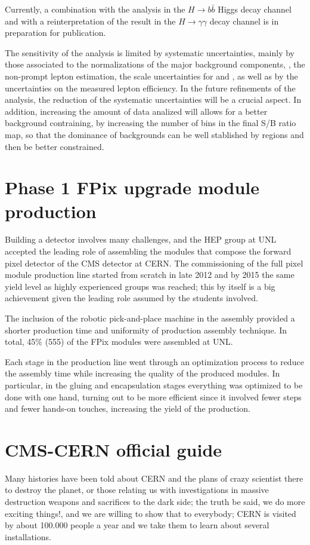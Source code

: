 Currently, a combination with the \tH analysis in the $H \to b\bar{b}$ Higgs decay channel and with a reinterpretation of the \ttH result in the $H\to \gamma\gamma$ decay channel is in preparation for publication.

The sensitivity of the analysis is limited by systematic uncertainties, mainly by those associated to the normalizations of the major background components, \ie, the non-prompt lepton estimation, the scale uncertainties for \ttW and \ttZ, as well as by the uncertainties on the measured lepton efficiency. In the future refinements of the analysis,  the reduction of the systematic uncertainties will be a crucial aspect. In addition, increasing the amount of data analized will allows for a better background contraining, by increasing the number of bins in the final S/B ratio map, so that the dominance of backgrounds can be well stablished by regions and then be better constrained.       
 
\section{Phase 1 FPix upgrade module production}

Building a detector involves many challenges, and the HEP group at UNL accepted the leading role of assembling the modules that compose the forward pixel detector of the CMS detector at CERN. The commissioning of the full pixel module production line started from scratch in late 2012 and by 2015 the same yield level as highly experienced groups was reached; this by itself is a big achievement given the leading role assumed by the students involved. %

The inclusion of the robotic pick-and-place machine in the assembly provided a shorter production time and uniformity of production assembly technique. In total, 45\% (555) of the FPix modules were assembled at UNL.  

Each stage in the production line went through an optimization process to reduce the assembly time while increasing the quality of the produced modules. In particular, in the gluing and encapsulation stages everything was optimized to be done with one hand, turning out to be more efficient since it involved fewer steps and fewer hands-on touches, increasing the yield of the production.

\clearpage

\section*{CMS-CERN official guide}
\small
Many histories have been told about CERN and the plans of crazy scientist there to destroy the planet, or those relating us with investigations in massive destruction weapons and sacrifices to the dark side; the truth be said, we do more exciting things!, and we are willing to show that to everybody; CERN is visited by about 100.000 people a year and we take them to learn about several installations.

